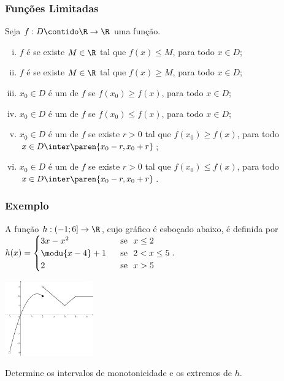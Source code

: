 \begin{frame}
\frametitle{Funções Limitadas} 

\begin{definicao}
Seja $f: D \contido \R \to \R$ uma função.
\begin{enumerate}[(i)]
	\item $f$ é  se existe $M \in \R$ tal
	que $f(x) \leq M$, para todo $x \in D$;
	\item $f$ é  se existe $M \in \R$ tal
	que $f(x) \geq M$, para todo $x \in D$;
	\item $x_0 \in D$ é um  de $f$ se
	$f(x_0) \geq f(x)$, para todo $x \in D$;
	\item $x_0 \in D$ é um  de $f$ se
	$f(x_0) \leq f(x)$, para todo $x \in D$;
	\item $x_0 \in D$ é um  de $f$ se
	existe $r>0$ tal que $f(x_0) \geq f(x)$, para todo $x \in D \inter \paren{x_0 - r , x_0+r}$;
	\item $x_0 \in D$ é um  de $f$ se
	existe $r>0$ tal que $f(x_0) \leq f(x)$, para todo $x \in D \inter \paren{x_0 - r ,
	x_0+r}$.
\end{enumerate}
\end{definicao}

\end{frame}





\begin{frame}
\frametitle{Exemplo} 
\begin{exemplo}
A função $h : \left( -1 ; 6 \right] \to \R$, cujo gráfico é esboçado
abaixo, é definida por $h(x) = \begin{cases}
																3x-x^2 & \ \text{ se } \ x\leq 2 \\
																\modu{x-4} +1 & \ \text{ se } \ 2 < x \leq 5 \\
																2 & \ \text{ se } \ x > 5 \\
																\end{cases}.$

\begin{center}
\includegraphics[width=3.8cm]{figures/funch.jpg}
\end{center}

Determine os intervalos de monotonicidade e os extremos de $h$.
\end{exemplo}
\end{frame}

